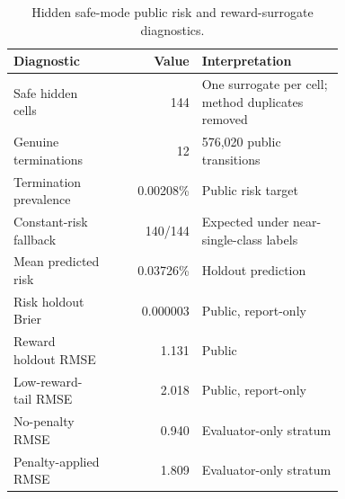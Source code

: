 \begin{table}[htbp]
\centering
\caption{Hidden safe-mode public risk and reward-surrogate diagnostics.}
\label{tab:safety-diagnostics}
\begin{tabular}{p{0.30\linewidth}rp{0.43\linewidth}}
\toprule
Diagnostic & Value & Interpretation \\
\midrule
Safe hidden cells & 144 & One surrogate per cell; method duplicates removed \\
Genuine terminations & 12 & 576,020 public transitions \\
Termination prevalence & 0.00208\% & Public risk target \\
Constant-risk fallback & 140/144 & Expected under near-single-class labels \\
Mean predicted risk & 0.03726\% & Holdout prediction \\
Risk holdout Brier & 0.000003 & Public, report-only \\
Reward holdout RMSE & 1.131 & Public \\
Low-reward-tail RMSE & 2.018 & Public, report-only \\
No-penalty RMSE & 0.940 & Evaluator-only stratum \\
Penalty-applied RMSE & 1.809 & Evaluator-only stratum \\
\bottomrule
\end{tabular}
\end{table}
